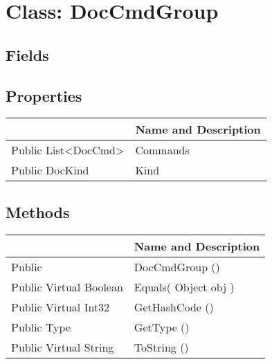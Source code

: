 \documentclass[11pt, oneside, a4paper]{book}
\begin{document}
\hypertarget{SoftwareEngineeringTools.{}Documentation.{}DocCmdGroup}{}
\section{Class: DocCmdGroup}

\subsection{Fields}

\subsection{Properties}
\begin{center}
\begin{tabular}{| p{3cm} | p{12cm} | }
\hline
\textbf{ } & \textbf{ Name and Description}\\
\hline
 Public  List<DocCmd> &  Commands\hypertarget{SoftwareEngineeringTools.{}Documentation.{}DocCmdGroup.{}Commands}{}\\
\hline
 Public  DocKind &  Kind\hypertarget{SoftwareEngineeringTools.{}Documentation.{}DocCmdGroup.{}Kind}{}\\
\hline
\end{tabular}
\end{center}

\subsection{Methods}
\begin{center}
\begin{tabular}{| p{3cm} | p{12cm} | }
\hline
\textbf{ } & \textbf{ Name and Description}\\
\hline
 Public  &  DocCmdGroup ()\hypertarget{SoftwareEngineeringTools.{}Documentation.{}DocCmdGroup.{}DocCmdGroup}{}\\
\hline
 Public  Virtual  Boolean &  Equals(\hypertarget{SoftwareEngineeringTools.{}Documentation.{}DocCmdGroup.{}Equals\_Object}{} Object  obj  )\\
\hline
 Public  Virtual  Int32 &  GetHashCode ()\hypertarget{SoftwareEngineeringTools.{}Documentation.{}DocCmdGroup.{}GetHashCode}{}\\
\hline
 Public  Type &  GetType ()\hypertarget{SoftwareEngineeringTools.{}Documentation.{}DocCmdGroup.{}GetType}{}\\
\hline
 Public  Virtual  String &  ToString ()\hypertarget{SoftwareEngineeringTools.{}Documentation.{}DocCmdGroup.{}ToString}{}\\
\hline
\end{tabular}
\end{center}
 
\end{document}
